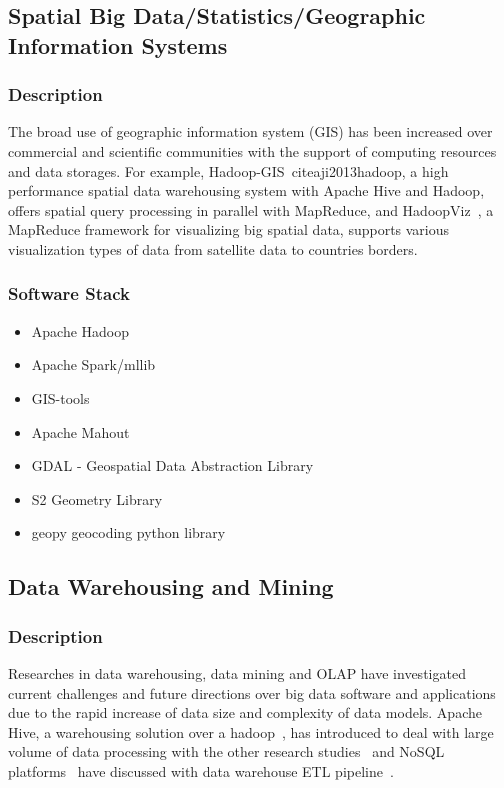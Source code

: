 \documentclass[9pt,twocolumn,twoside]{styles/osajnl}
\begin{document}
\begin{table}[htb]
\subsection{Spatial Big Data/Statistics/Geographic Information Systems}

\subsubsection{Description}

The broad use of geographic information system (GIS) has been increased over
commercial and scientific communities with the support of computing resources
and data storages. For example, Hadoop-GIS~cite{aji2013hadoop}, a high
performance spatial data warehousing system with Apache Hive and Hadoop, offers
spatial query processing in parallel with MapReduce, and
HadoopViz~\cite{eldawy2016hadoopviz}, a MapReduce framework for
visualizing big spatial data, supports various visualization types of data from
satellite data to countries borders.


\subsubsection{Software Stack}

\begin{itemize}
\item Apache Hadoop
\item Apache Spark/mllib
\item GIS-tools
\item Apache Mahout
\item GDAL - Geospatial Data Abstraction Library
\item S2 Geometry Library
\item geopy geocoding python library
\end{itemize}




\subsection{Data Warehousing and Mining}

\subsubsection{Description}

Researches in data warehousing, data mining and OLAP have investigated
current challenges and future directions over big data software and
applications~\cite{cuzzocrea2013data} due to the rapid
increase of data size and complexity of data models. Apache Hive, a
warehousing solution over a hadoop~\cite{thusoo2009hive}, has introduced to
deal with large volume of data processing with the other research
studies~\cite{chen2010cheetah,he2011rcfile} and NoSQL
platforms~\cite{chevalier2015implementing} have discussed with data warehouse
ETL pipeline~\cite{goodhope2012building}.



\end{table}
\end{document}
